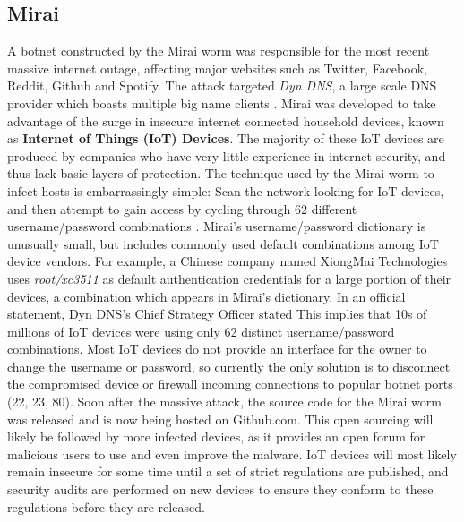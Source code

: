 \subsection{Mirai}
A botnet constructed by the Mirai worm was responsible for the most recent massive internet
outage, affecting major websites such as Twitter, Facebook, Reddit, Github and Spotify.
The attack targeted \textit{Dyn DNS}, a large scale DNS provider
which boasts multiple big name clients \cite{mirai}.
Mirai was developed to take advantage of the surge in insecure internet connected
household devices, known as \textbf{Internet of Things (IoT) Devices}.
The majority of these IoT devices are produced by companies
who have very little experience in internet security, and thus lack
basic layers of protection.  The technique used by the Mirai worm to infect hosts is embarrassingly simple:
Scan the network looking for IoT devices, and then attempt to gain access by
cycling through 62 different username/password combinations \cite{mirai}.
Mirai's username/password dictionary is unusually small, but includes commonly
used default combinations among IoT device vendors.  For example, a Chinese company
named XiongMai Technologies uses \textit{root/xc3511} as default authentication credentials
for a large portion of their devices, a combination which appears in Mirai's dictionary.
In an official statement, Dyn DNS's Chief Strategy Officer stated 
 \cite{dyndns}
This implies that 10s of millions of IoT devices were using only 62 distinct
username/password combinations. Most IoT devices do not provide an interface for
the owner to change the username or password, so currently the only solution is to
disconnect the compromised device or firewall incoming connections to popular
botnet ports (22, 23, 80). Soon after the massive attack, the source code for the
Mirai worm was released and is now being hosted on Github.com. This open sourcing
will likely be followed by more infected devices, as it provides an open forum
for malicious users to use and even improve the malware. IoT devices will
most likely remain insecure for some time until a set of strict regulations are
published, and security audits are performed on new devices to ensure they conform
to these regulations before they are released.


